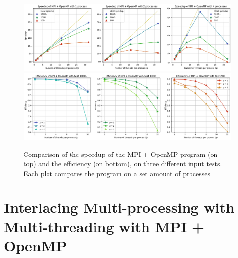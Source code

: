 \documentclass[11pt, journal]{IEEEtran}
\begin{document}
\begin{table}
    \label{cuda_times}
    \centering
    \caption{Performances of the CUDA version $\left(\mu \pm \sigma^2\right)$}
    \renewcommand{\arraystretch}{1.3}
\end{table}

\begin{figure}
    \label{stats_mpi_omp}
    \centering
    \includegraphics[width=\linewidth]{imgs/mpi_omp_speedup.png}
    \includegraphics[width=\linewidth]{imgs/mpi_omp_efficiency.png}

    \caption{Comparison of the speedup of the MPI + OpenMP program (on top) and the efficiency (on bottom), on three different input tests. Each plot compares the program on a set amount of processes}
\end{figure}

\section{Interlacing Multi-processing with Multi-threading with MPI + OpenMP}
\end{document}
